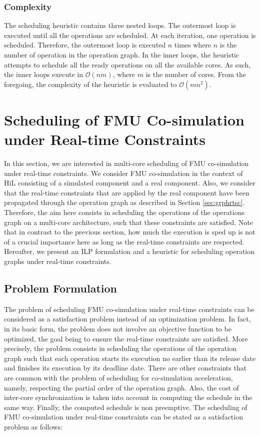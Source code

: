 \subsubsection{Complexity}

The scheduling heuristic contains three nested loops. The outermost loop is executed until all the operations are scheduled. At each iteration, one operation is scheduled. Therefore, the outermost loop is executed $n$ times where $n$ is the number of operation in the operation graph. In the inner loops, the heuristic attempts to schedule all the ready operations on all the available cores. As such, the inner loops execute in $\mathcal{O}(nm)$, where $m$ is the number of cores. From the foregoing, the complexity of the heuristic is evaluated to $\mathcal{O}(mn^2)$.

\section{Scheduling of FMU Co-simulation under Real-time Constraints}

In this section, we are interested in multi-core scheduling of FMU co-simulation under real-time constraints. We consider FMU co-simulation in the context of HiL consisting of a simulated component and a real component. Also, we consider that the real-time constraints that are applied by the real component have been propagated through the operation graph as described in Section \ref{sec:grphrtsc}. Therefore, the aim here consists in scheduling the operations of the operations graph on a multi-core architecture, such that these constraints are satisfied. Note that in contrast to the previous section, how much the execution is sped up is not of a crucial importance here as long as the real-time constraints are respected. Hereafter, we present an ILP formulation and a heuristic for scheduling operation graphs under real-time constraints.

\subsection{Problem Formulation}

The problem of scheduling FMU co-simulation under real-time constraints can be considered as a satisfaction problem instead of an optimization problem. In fact, in its basic form, the problem does not involve an objective function to be optimized, the goal being to ensure the real-time constraints are satisfied. More precisely, the problem consists in scheduling the operations of the operation graph such that each operation starts its execution no earlier than its release date and finishes its execution by its deadline date. There are other constraints that are common with the problem of scheduling for co-simulation acceleration, namely, respecting the partial order of the operation graph. Also, the cost of inter-core synchronization is taken into account in computing the schedule in the same way. Finally, the computed schedule is non preemptive. The scheduling of FMU co-simulation under real-time constraints can be stated as a satisfaction problem as follows:

